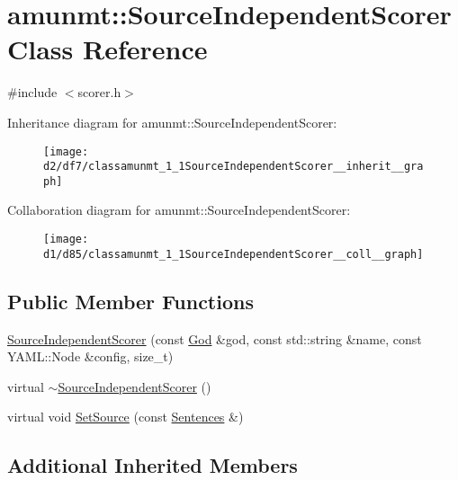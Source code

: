 \hypertarget{classamunmt_1_1SourceIndependentScorer}{}\section{amunmt\+:\+:Source\+Independent\+Scorer Class Reference}
\label{classamunmt_1_1SourceIndependentScorer}


{\ttfamily \#include $<$scorer.\+h$>$}



Inheritance diagram for amunmt\+:\+:Source\+Independent\+Scorer\+:
\nopagebreak
\begin{figure}[H]
\begin{center}
\leavevmode
\texttt{[image: d2/df7/classamunmt\_1\_1SourceIndependentScorer\_\_inherit\_\_graph]}
\end{center}
\end{figure}


Collaboration diagram for amunmt\+:\+:Source\+Independent\+Scorer\+:
\nopagebreak
\begin{figure}[H]
\begin{center}
\leavevmode
\texttt{[image: d1/d85/classamunmt\_1\_1SourceIndependentScorer\_\_coll\_\_graph]}
\end{center}
\end{figure}
\subsection*{Public Member Functions}
\begin{DoxyCompactItemize}
\item 
\hyperlink{classamunmt_1_1SourceIndependentScorer_a4bc8ce3f30f26b74f55ac72ab754a983}{Source\+Independent\+Scorer} (const \hyperlink{classamunmt_1_1God}{God} \&god, const std\+::string \&name, const Y\+A\+M\+L\+::\+Node \&config, size\+\_\+t)
\item 
virtual \hyperlink{classamunmt_1_1SourceIndependentScorer_af81fd630959c977dd0dc3eacc9d4314d}{$\sim$\+Source\+Independent\+Scorer} ()
\item 
virtual void \hyperlink{classamunmt_1_1SourceIndependentScorer_a1fae40f47292149ecb7b9ac90f5b0e4d}{Set\+Source} (const \hyperlink{classamunmt_1_1Sentences}{Sentences} \&)
\end{DoxyCompactItemize}
\subsection*{Additional Inherited Members}


